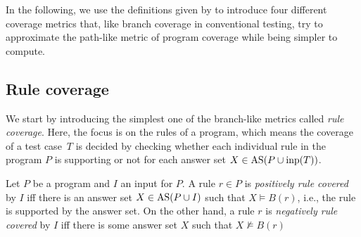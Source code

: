 In the following, we use the definitions given by \cite{Jan+10} to introduce four different coverage metrics that, like branch coverage in conventional testing, try to approximate the path-like metric of program coverage while being simpler to compute.

\begin{comment}
    - general introduction to branch-like coverage in conventional programming languages (source)     \/
    
        - use the control flow graph and cover every possible branch through this graph   \/
    
    - less complete but easier to compute, still very potent(?) (source)    (\/)
    
    - there are different types of branch like coverage even in conventional programming languages (source), the same is true here      \/

    - maybe example for both branch and path coverage?? -> requires conventional program as example -> maybe not
\end{comment}

\subsection{Rule coverage}
\label{subsec:Coverage metrics/Branch-like coverage/Rule coverage}
We start by introducing the simplest one of the branch-like metrics called \emph{rule coverage}. Here, the focus is on the rules of a program, which means the coverage of a test case~$T$ is decided by checking whether each individual rule in the program $P$ is supporting or not for each answer set \(X \in \operatorname{AS}(P \cup \operatorname{inp}(T))\).

\begin{definition}
\label{def:rule coverage}
    Let $P$ be a program and $I$ an input for $P$. A rule \(r \in P\) is \emph{positively rule covered} by $I$ iff there is an answer set \(X \in \operatorname{AS}(P \cup I)\) such that \(X \models B(r)\), i.e., the rule is supported by the answer set.
    On the other hand, a rule $r$ is \emph{negatively rule covered} by $I$ iff there is some answer set $X$ such that \(X \not\models B(r)\)
\end{definition}

